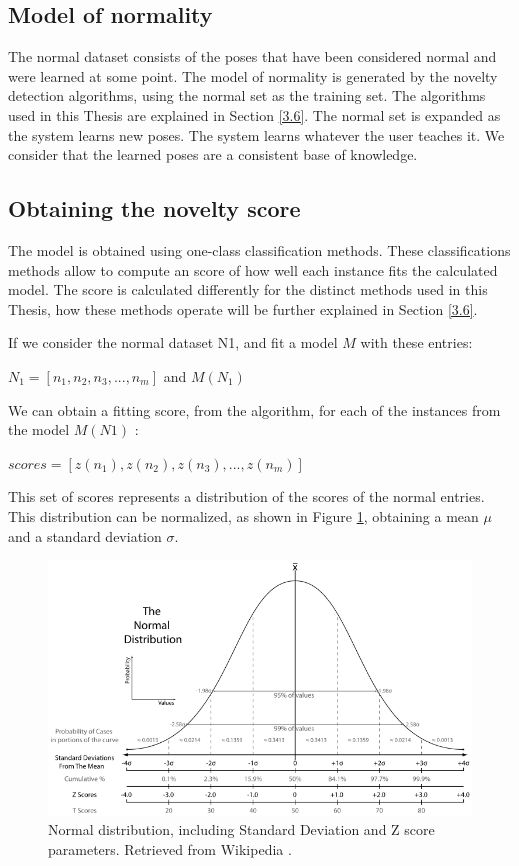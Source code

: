 \subsection{Model of normality}

The normal dataset consists of the poses that have been considered normal and were learned at some point. The model of normality is generated by the novelty detection algorithms, using the normal set as the training set. The algorithms used in this Thesis are explained in Section \ref{3.6}. The normal set is expanded as the system learns new poses. The system learns whatever the user teaches it. We consider that the learned poses are a consistent base of knowledge. 

\subsection{Obtaining the novelty score}

The model is obtained using one-class classification methods. These classifications methods allow to compute an score of how well each instance fits the calculated model. The score is calculated differently for the distinct methods used in this Thesis, how these methods operate will be further explained in Section \ref{3.6}.

If we consider the normal dataset N1, and fit a model $M$ with these entries:
\medskip

\centerline{$ N_1 = [n_1, n_2, n_3,...,n_m]  $ and $ M(N_1)$ }

We can obtain a fitting score, from the algorithm, for each of the instances from the model $ M(N1) $ :
\medskip

\centerline{$ scores = [z(n_1), z(n_2), z(n_3),...,z(n_m)] $}

This set of scores represents a distribution of the scores of the normal entries. This distribution can be normalized, as shown in Figure \ref{fig:normal_d}, obtaining a mean $\mu$ and a standard deviation $\sigma$. 

\begin{figure}[h]
\includegraphics[width=15cm]{Figures/Normal_d}
\centering
\caption[Normal distribution]{Normal distribution, including Standard Deviation and Z score parameters. Retrieved from Wikipedia \cite{standard}. \label{fig:normal_d}}
\end{figure}

